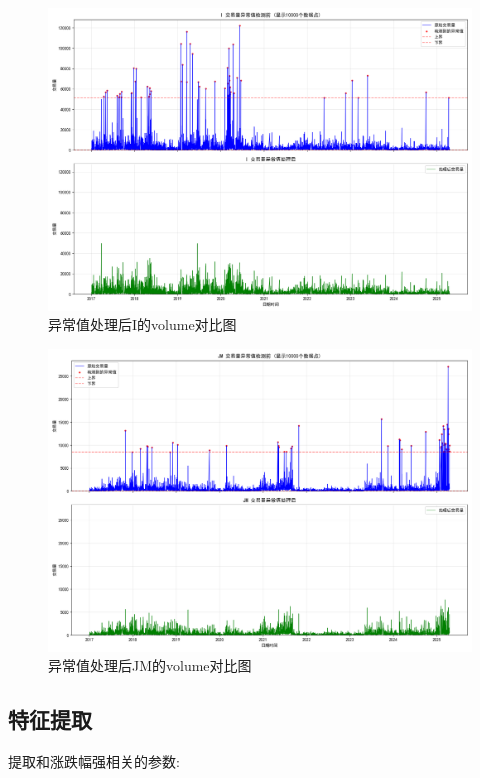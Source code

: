 \documentclass[a4paper,11pt]{ctexart}
\begin{document}
\begin{enumerate}
  \begin{figure}[H]
    \centering
    \includegraphics[width=\textwidth]{./v2/v3/I.png}
    \caption*{异常值处理后I的volume对比图}
  \end{figure}

  \begin{figure}[H]
    \centering
    \includegraphics[width=\textwidth]{./v2/v3/JM.png}
    \caption*{异常值处理后JM的volume对比图}
  \end{figure}

\end{enumerate}
\newpage
\subsection{特征提取}
提取和涨跌幅强相关的参数:
\end{document}
